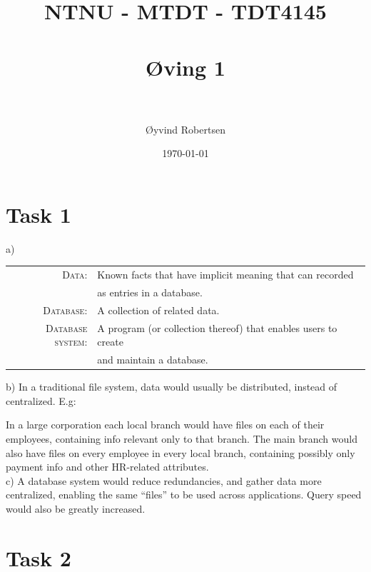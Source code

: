 \documentclass[paper=a4, fontsize=11pt]{scrartcl} %
\title{%
\normalfont \normalsize
\textsc{NTNU - MTDT - TDT4145} \\ [25pt] %
\horrule{0.5pt} \\[0.4cm] %
\huge {Øving 1} \\ %
\horrule{2pt} \\[0.5cm] %
}
\author{Øyvind Robertsen} %
\date{\normalsize\today} %
\numberwithin{equation}{section} %
\numberwithin{figure}{section} %
\numberwithin{table}{section} %
\begin{document}
\maketitle %

\section*{Task 1}

a)
\begin{tabular}{rl}
\textsc{Data:}  & Known facts that have implicit meaning that can recorded \\
                & as entries in a database. \\

\textsc{Database:} & A collection of related data. \\

\textsc{Database system:}   & A program (or collection thereof) that enables users to create \\
                & and maintain a database.
\end{tabular}

\vspace{0.5cm}

b) In a traditional file system, data would usually be distributed, instead of centralized. E.g:

In a large corporation each local branch would have files on each of their employees, containing info relevant only to that branch. The main branch would also have files on every employee in every local branch, containing possibly only payment info and other HR-related attributes. \\

c) A database system would reduce redundancies, and gather data more centralized, enabling the same ``files'' to be used across applications. Query speed would also be greatly increased.
\newpage

\section*{Task 2}
\end{document}

